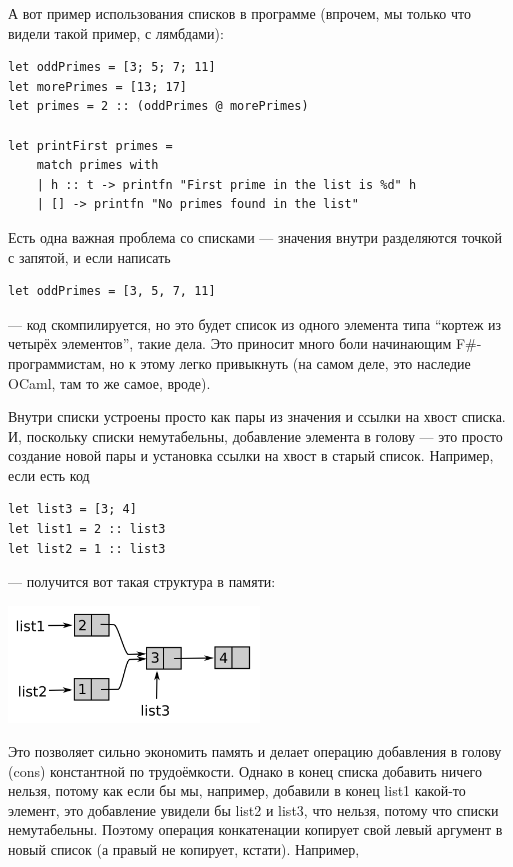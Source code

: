\documentclass[a5paper]{article}
\begin{document}
А вот пример использования списков в программе (впрочем, мы только что видели такой пример, с лямбдами):

\begin{verbatim}
let oddPrimes = [3; 5; 7; 11]
let morePrimes = [13; 17]
let primes = 2 :: (oddPrimes @ morePrimes)

let printFirst primes =
    match primes with
    | h :: t -> printfn "First prime in the list is %d" h
    | [] -> printfn "No primes found in the list"
\end{verbatim}

Есть одна важная проблема со списками --- значения внутри разделяются точкой с запятой, и если написать

\begin{verbatim}
let oddPrimes = [3, 5, 7, 11]
\end{verbatim}

--- код скомпилируется, но это будет список из одного элемента типа ``кортеж из четырёх элементов'', такие дела. Это приносит много боли начинающим F\#-программистам, но к этому легко привыкнуть (на самом деле, это наследие OCaml, там то же самое, вроде).

Внутри списки устроены просто как пары из значения и ссылки на хвост списка. И, поскольку списки немутабельны, добавление элемента в голову --- это просто создание новой пары и установка ссылки на хвост в старый список. Например, если есть код

\begin{verbatim}
let list3 = [3; 4]
let list1 = 2 :: list3
let list2 = 1 :: list3
\end{verbatim}

--- получится вот такая структура в памяти:

\begin{center}
	\includegraphics[width=0.5\textwidth]{lists.png}
\end{center}

Это позволяет сильно экономить память и делает операцию добавления в голову (cons) константной по трудоёмкости. Однако в конец списка добавить ничего нельзя, потому как если бы мы, например, добавили в конец list1 какой-то элемент, это добавление увидели бы list2 и list3, что нельзя, потому что списки немутабельны. Поэтому операция конкатенации копирует свой левый аргумент в новый список (а правый не копирует, кстати). Например, 
\end{document}
